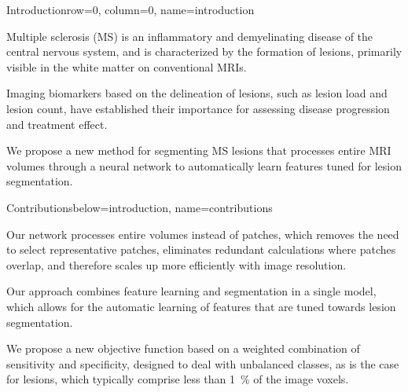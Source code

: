 \documentclass[%
portrait,paperwidth=841mm,paperheight=1180mm,%
margin=2cm,
fontscale=0.32
]{baposter}
\begin{document}
\begin{poster}

% 
% 


\begin{headerblock}{Introduction}{row=0, column=0, name=introduction}
\begin{compactitem}
\item Multiple sclerosis (MS) is an inflammatory and demyelinating disease of
the central nervous system, and is characterized by the formation of lesions,
primarily visible in the white matter on conventional MRIs.
\item Imaging biomarkers based on the delineation of lesions, such as lesion
load and lesion count, have established their importance for assessing disease
progression and treatment effect.
\item We propose a new method for segmenting MS lesions that processes entire
MRI volumes through a neural network
to automatically learn features tuned for lesion segmentation. 
\end{compactitem}
\end{headerblock}


\begin{headerblock}{Contributions}{below=introduction, name=contributions}
\begin{compactitem}
\item Our network processes entire volumes instead of patches, which removes the
need to select representative patches, eliminates redundant calculations where
patches overlap, and therefore scales up more efficiently with image resolution.
\item Our approach combines feature learning and segmentation in a single model,
which allows for the automatic learning of features that are tuned towards lesion
segmentation.
\item We propose a new objective function based on a weighted combination of
sensitivity and specificity, designed to deal with unbalanced classes, as is the
case for lesions, which typically comprise less than \SI{1}{\percent} of the
image voxels.
\end{compactitem}
\end{headerblock}


\end{poster}
\end{document}

